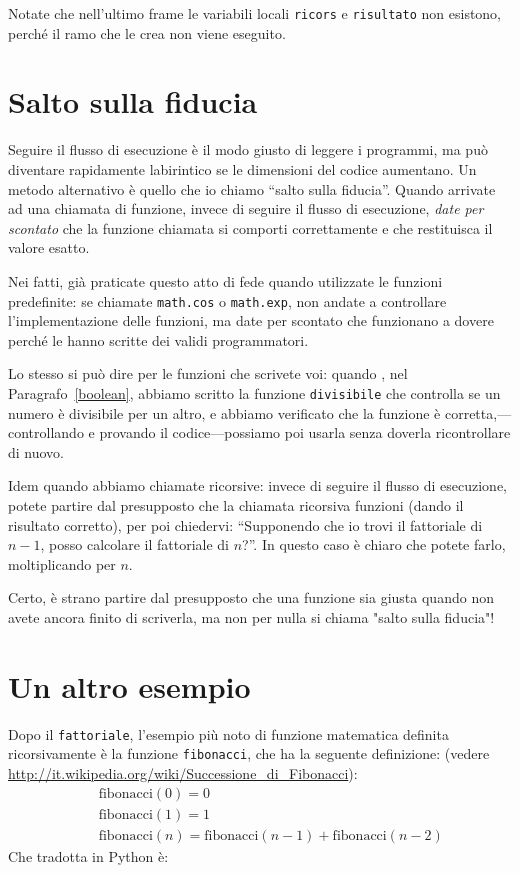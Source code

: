 \documentclass[10pt]{book}
\begin{document}
Notate che nell'ultimo frame le variabili locali {\tt ricors} e {\tt risultato} non esistono, perché il ramo che le crea non viene eseguito.


\section{Salto sulla fiducia}

Seguire il flusso di esecuzione è il modo giusto di leggere i programmi, ma
può diventare rapidamente labirintico se le dimensioni del codice aumentano. Un metodo alternativo è quello che io chiamo ``salto sulla fiducia''.  Quando arrivate ad una chiamata di funzione, invece di seguire il flusso di esecuzione, {\em date per scontato} che la funzione chiamata si comporti correttamente e   che restituisca il valore esatto.

Nei fatti, già praticate questo atto di fede quando utilizzate le funzioni predefinite: se chiamate {\tt math.cos} o {\tt math.exp}, non andate a controllare l'implementazione delle funzioni, ma date per scontato che funzionano a dovere perché le hanno scritte dei validi programmatori.

Lo stesso si può dire per le funzioni che scrivete voi: quando
, nel Paragrafo~\ref{boolean}, abbiamo scritto la funzione
\verb"divisibile" che controlla se un numero è divisibile per un altro, e abbiamo verificato che la funzione è corretta,---controllando e provando il codice---possiamo poi usarla senza doverla ricontrollare di nuovo.

Idem quando abbiamo chiamate ricorsive: invece di seguire il flusso di esecuzione, potete partire dal presupposto che la chiamata ricorsiva funzioni
(dando il risultato corretto), per poi chiedervi: ``Supponendo che io trovi il fattoriale di $n-1$, posso calcolare il fattoriale di $n$?''.  In questo caso è chiaro che potete farlo, moltiplicando per $n$.

Certo, è strano partire dal presupposto che una funzione sia giusta quando non avete ancora finito di scriverla, ma non per nulla si chiama "salto sulla fiducia"!


\section{Un altro esempio}
\label{one.more.example}

Dopo il {\tt fattoriale}, l'esempio più noto di funzione matematica definita ricorsivamente è la funzione {\tt fibonacci}, che ha la seguente definizione: (vedere \url{http://it.wikipedia.org/wiki/Successione_di_Fibonacci}):
%
\begin{eqnarray*}
&& \mathrm{fibonacci}(0) = 0 \\
&& \mathrm{fibonacci}(1) = 1 \\
&& \mathrm{fibonacci}(n) = \mathrm{fibonacci}(n-1) + \mathrm{fibonacci}(n-2)
\end{eqnarray*}
%
Che tradotta in Python è:
\end{document}
